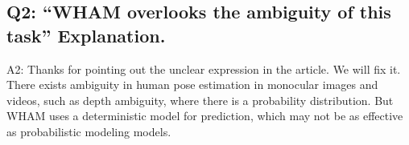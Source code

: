 \documentclass{article}
\begin{document}
\subsection{Q2: ``WHAM overlooks the ambiguity of this task'' Explanation.}\label{q2-wham-overlooks-the-ambiguity-of-this-task-explanation.}

A2: Thanks for pointing out the unclear expression in the article. We will fix it. There exists ambiguity in human pose estimation in monocular images and videos, such as depth ambiguity, where there is a probability distribution. But WHAM uses a deterministic model for prediction, which may not be as effective as probabilistic modeling models.









\end{document}
